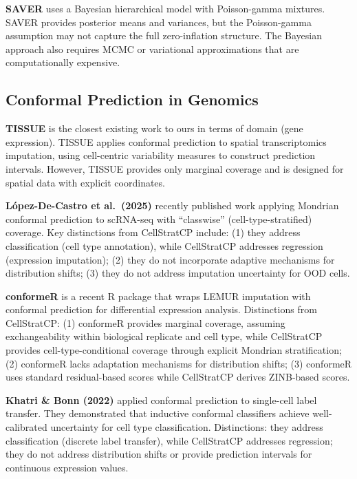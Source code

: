\documentclass{article}
\begin{document}
\textbf{SAVER} \citep{huang2018saver} uses a Bayesian hierarchical model with Poisson-gamma mixtures. SAVER provides posterior means and variances, but the Poisson-gamma assumption may not capture the full zero-inflation structure. The Bayesian approach also requires MCMC or variational approximations that are computationally expensive.

\subsection{Conformal Prediction in Genomics}

\textbf{TISSUE} \citep{sun2024tissue} is the closest existing work to ours in terms of domain (gene expression). TISSUE applies conformal prediction to spatial transcriptomics imputation, using cell-centric variability measures to construct prediction intervals. However, TISSUE provides only marginal coverage and is designed for spatial data with explicit coordinates.

\textbf{L{\'o}pez-De-Castro et al.~(2025)} \citep{lopez2025conformal} recently published work applying Mondrian conformal prediction to scRNA-seq with ``classwise'' (cell-type-stratified) coverage. Key distinctions from CellStratCP include: (1) they address classification (cell type annotation), while CellStratCP addresses regression (expression imputation); (2) they do not incorporate adaptive mechanisms for distribution shifts; (3) they do not address imputation uncertainty for OOD cells.

\textbf{conformeR} \citep{leclerc2025conformer} is a recent R package that wraps LEMUR imputation with conformal prediction for differential expression analysis. Distinctions from CellStratCP: (1) conformeR provides marginal coverage, assuming exchangeability within biological replicate and cell type, while CellStratCP provides cell-type-conditional coverage through explicit Mondrian stratification; (2) conformeR lacks adaptation mechanisms for distribution shifts; (3) conformeR uses standard residual-based scores while CellStratCP derives ZINB-based scores.

\textbf{Khatri \& Bonn (2022)} \citep{khatri2022uncertainty} applied conformal prediction to single-cell label transfer. They demonstrated that inductive conformal classifiers achieve well-calibrated uncertainty for cell type classification. Distinctions: they address classification (discrete label transfer), while CellStratCP addresses regression; they do not address distribution shifts or provide prediction intervals for continuous expression values.
\end{document}
